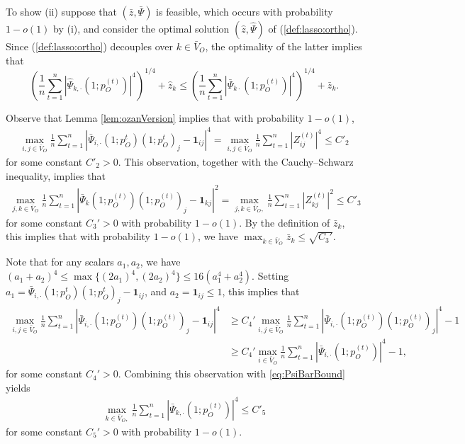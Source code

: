 \documentclass[opre,nonblindrev]{informs3} %
\def\Pii{\bar{\Psi}_{i,\cdot} }
\def\Phk{\hat{\Psi}_{k,\cdot} }
\begin{document}
\begin{APPENDIX}{}
To show (ii) suppose that $(\bar{z},\bar \Psi)$ is feasible, which occurs with probability $1-o(1)$ by (i), and consider the optimal solution
$(\hat{z},\hat \Psi)$  of (\ref{def:lasso:ortho}).
Since (\ref{def:lasso:ortho}) decouples over $k\in \bar{V}_O$,
the optimality of the latter implies that 
\begin{equation}\label{eq:optVsFeas_o}
\left(\frac{1}{n}\sum_{t=1}^n|\Phk(1;p_O^{(t)})|^4\right)^{1/4} +  \hat z_k \leq  \left(\frac{1}{n}\sum_{t=1}^n|\bar\Psi_{k\cdot}(1;p_O^{(t)})|^4\right)^{1/4}  +  \bar{z}_k.
\end{equation}


Observe that Lemma \ref{lem:ozanVersion} implies that with probability $1-o(1)$,
\begin{equation} \label{eq:PsiBarBound}
\begin{aligned}
\max_{i,j\in \bar{V}_O}
\frac{1}{n}\sum_{t=1}^n|
\Pii (1;p_O^t)(1;p_O^t)_j - \mathbf{1}_{ij}|^4
=
\max_{i,j\in \bar{V}_O}
\frac{1}{n}\sum_{t=1}^n|Z^{(t)}_{ij}|^4 \leq C'_2
\end{aligned}
\end{equation}
for some constant $C'_2 >0$.
This observation, together with the Cauchy--Schwarz inequality, implies that
\begin{equation}
\begin{aligned}
\max_{j,k \in \bar{V}_O} \frac{1}{n} \sum_{t=1}^n | \bar \Psi_k(1;p_O^{(t)})(1;p_O^{(t)})_j- \mathbf{1}_{kj}|^2
=\max_{j,k\in \bar{V}_O,}
\frac{1}{n}\sum_{t=1}^n|Z^{(t)}_{kj}|^2
\leq C'_3
\end{aligned}
\end{equation}
for some constant $C_3'>0$ with probability $1-o(1)$.
By the definition of $\bar{z}_k$, this implies that with probability $1-o(1)$, we have
$\max_{k\in \bar{V}_O}\bar{z}_k \leq \sqrt{C_3'}$.


Note that for any scalars $a_1, a_2$, we have
$(a_1+a_2)^4 \leq \max\{(2a_1)^4,(2a_2)^4 \}\leq 16 (a_1^4 +a_2^4)$.
Setting
$a_1=
\Pii (1;p_O^t)(1;p_O^t)_j - \mathbf{1}_{ij}$, and $a_2=\mathbf{1}_{ij}\leq 1$, this implies that
\begin{equation}
\begin{aligned}
\max_{i,j\in \bar{V}_O}
\frac{1}{n}\sum_{t=1}^n|
\Pii (1;p_O^{(t)})(1;p_O^{(t)})_j - \mathbf{1}_{ij}|^4 &\geq 
C_4'
\max_{i,j\in \bar{V}_O}
\frac{1}{n}\sum_{t=1}^n|
\Pii (1;p_O^{(t)})(1;p_O^{(t)})_j|^4  - 1 \\
&\geq 
C_4'
\max_{i\in \bar{V}_O}
\frac{1}{n}\sum_{t=1}^n|
\Pii (1;p_O^{(t)})|^4  - 1,
\end{aligned}
\end{equation}
for some constant $C_4'>0$.
Combining this observation with \eqref{eq:PsiBarBound} yields
\begin{equation}
\begin{aligned}
\max_{k\in \bar{V}_O,}
\frac{1}{n}\sum_{t=1}^n|\bar\Psi_{k,\cdot}(1;p_O^{(t)})|^{4}
\leq C'_5
\end{aligned}
\end{equation}
for some constant $C_5'>0$ with probability $1-o(1)$.


\end{APPENDIX}
\end{document}
